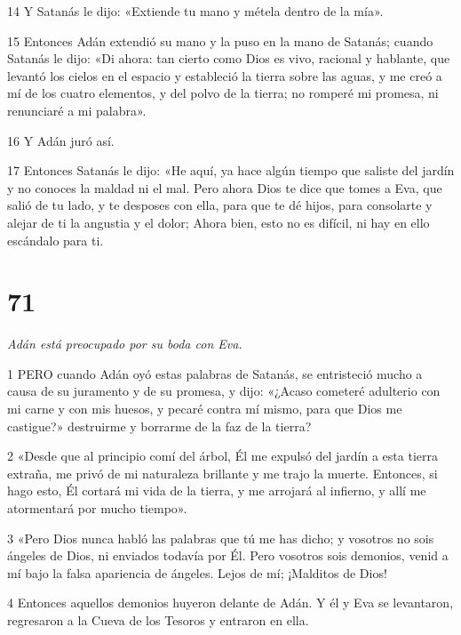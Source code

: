 \par 14 Y Satanás le dijo: «Extiende tu mano y métela dentro de la mía».

\par 15 Entonces Adán extendió su mano y la puso en la mano de Satanás; cuando Satanás le dijo: «Di ahora: tan cierto como Dios es vivo, racional y hablante, que levantó los cielos en el espacio y estableció la tierra sobre las aguas, y me creó a mí de los cuatro elementos, y del polvo de la tierra; no romperé mi promesa, ni renunciaré a mi palabra».

\par 16 Y Adán juró así.

\par 17 Entonces Satanás le dijo: «He aquí, ya hace algún tiempo que saliste del jardín y no conoces la maldad ni el mal. Pero ahora Dios te dice que tomes a Eva, que salió de tu lado, y te desposes con ella, para que te dé hijos, para consolarte y alejar de ti la angustia y el dolor; Ahora bien, esto no es difícil, ni hay en ello escándalo para ti.

\chapter{71}

\par \textit{Adán está preocupado por su boda con Eva.}

\par 1 PERO cuando Adán oyó estas palabras de Satanás, se entristeció mucho a causa de su juramento y de su promesa, y dijo: «¿Acaso cometeré adulterio con mi carne y con mis huesos, y pecaré contra mí mismo, para que Dios me castigue?» destruirme y borrarme de la faz de la tierra?

\par 2 «Desde que al principio comí del árbol, Él me expulsó del jardín a esta tierra extraña, me privó de mi naturaleza brillante y me trajo la muerte. Entonces, si hago esto, Él cortará mi vida de la tierra, y me arrojará al infierno, y allí me atormentará por mucho tiempo».

\par 3 «Pero Dios nunca habló las palabras que tú me has dicho; y vosotros no sois ángeles de Dios, ni enviados todavía por Él. Pero vosotros sois demonios, venid a mí bajo la falsa apariencia de ángeles. Lejos de mí; ¡Malditos de Dios!

\par 4 Entonces aquellos demonios huyeron delante de Adán. Y él y Eva se levantaron, regresaron a la Cueva de los Tesoros y entraron en ella.

